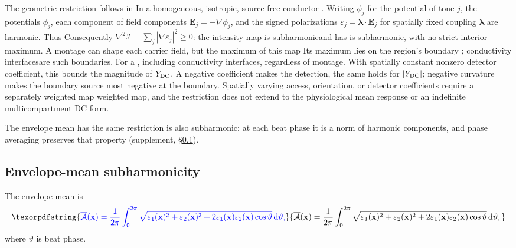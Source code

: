 \documentclass[11pt,a4paper]{article}
\newif\ifjne
\providecommand{\DIFaddtex}[1]{{\protect\color{blue} \sf #1}} %
\providecommand{\DIFdeltex}[1]{{\protect\color{red} \scriptsize #1}} %
\providecommand{\DIFaddbegin}{} %
\providecommand{\DIFaddend}{} %
\providecommand{\DIFdelbegin}{} %
\providecommand{\DIFdelend}{} %
\providecommand{\DIFadd}[1]{\texorpdfstring{\DIFaddtex{#1}}{#1}} %
\providecommand{\DIFdel}[1]{\texorpdfstring{\DIFdeltex{#1}}{}} %
\begin{document}
\DIFdelbegin \DIFdel{The geometric restriction follows in }\DIFdelend \DIFaddbegin \DIFadd{In }\DIFaddend a homogeneous, isotropic, source-free conductor\DIFdelbegin \DIFdel{. Writing $\phi_j$ for the potential of tone $j$}\DIFdelend , the potentials $\phi_j$,
\DIFdelbegin \DIFdel{each component of }\DIFdelend \DIFaddbegin \DIFadd{field components }\DIFaddend $\mathbf E_j=-\nabla\phi_j$, and \DIFdelbegin \DIFdel{the
signed }\DIFdelend polarizations
$\varepsilon_j=\boldsymbol\lambda\cdot\mathbf E_j$ for spatially fixed
coupling $\boldsymbol\lambda$ are harmonic. \DIFdelbegin \DIFdel{Thus
}\DIFdelend \DIFaddbegin \DIFadd{Consequently
}\DIFaddend $\nabla^2\mathcal I=\sum_j|\nabla\varepsilon_j|^2\ge0$:
the intensity \DIFdelbegin \DIFdel{map is subharmonicand has }\DIFdelend \DIFaddbegin \DIFadd{is subharmonic, with }\DIFaddend no strict interior maximum. \DIFdelbegin \DIFdel{A montage can shape each
carrier field, but the maximum
of this map }\DIFdelend \DIFaddbegin \DIFadd{Its maximum
}\DIFaddend lies on the region's boundary\DIFdelbegin \DIFdel{;
conductivity interfacesare such boundaries. For a }\DIFdelend \DIFaddbegin \DIFadd{, including conductivity interfaces, regardless
of montage. With }\DIFaddend spatially constant nonzero \DIFdelbegin \DIFdel{detector coefficient, this bounds the magnitude
of $Y_{\rm DC}$. A negative coefficient makes the }\DIFdelend \DIFaddbegin \DIFadd{detection, the same holds for
$|Y_{\rm DC}|$; negative curvature makes the boundary }\DIFaddend source most negative\DIFdelbegin \DIFdel{at the
boundary}\DIFdelend .
Spatially varying \DIFaddbegin \DIFadd{access, orientation, or detector }\DIFaddend coefficients require a
\DIFdelbegin \DIFdel{separately weighted map}\DIFdelend \DIFaddbegin \DIFadd{weighted map, and the restriction does not extend to the physiological mean
response or an indefinite multicompartment DC form}\DIFaddend .

The envelope mean \DIFdelbegin \DIFdel{has the same restriction}\DIFdelend \DIFaddbegin \DIFadd{is also subharmonic: at each beat phase it is a norm of
harmonic components, and phase averaging preserves that property (supplement,
\S\ref{supp:envelope-proof}).
}\ifjne\else
\subsection{\DIFadd{Envelope-mean subharmonicity}}\label{supp:envelope-proof}
\DIFadd{The envelope mean is
}\[
\DIFadd{\overline{\mathcal A}(\mathbf x)=\frac{1}{2\pi}\int_0^{2\pi}
\sqrt{\varepsilon_1(\mathbf x)^2+\varepsilon_2(\mathbf x)^2
+2\varepsilon_1(\mathbf x)\varepsilon_2(\mathbf x)\cos\vartheta}\,\mathrm d\vartheta,
}\]
\DIFadd{where $\vartheta$ is beat phase.
}
\end{document}
